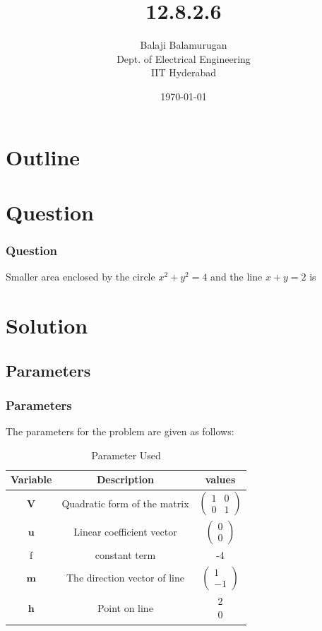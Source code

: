 \documentclass{beamer}
\title{12.8.2.6}
\author{Balaji Balamurugan \\ Dept. of Electrical Engineering \\ IIT Hyderabad}
\date{\today}
\theoremstyle{remark}
\newcommand{\myvec}[1]{\ensuremath{\begin{pmatrix}#1\end{pmatrix}}}
\let\vec\mathbf
\numberwithin{equation}{section}
\begin{document}
\begin{frame}
\titlepage
\end{frame}

\section*{Outline}
\begin{frame}
\tableofcontents
\end{frame}

\section{Question}
\begin{frame}
\frametitle{Question}
Smaller area enclosed by the circle $x^2 + y^2 = 4 $ and the line $x + y = 2 $ is 
\end{frame}

\section{Solution}
\subsection{Parameters}
\begin{frame}
\frametitle{Parameters}
The parameters for the problem are given as follows:
\begin{table}[H]
    \centering
    \begin{tabular}[12pt]{ |c| c| c |}
    \hline
    \textbf{Variable} & \textbf{Description} & \textbf{values}\\ 
    \hline
    $\vec{V}$ & Quadratic form of the matrix & $\myvec{1 & 0 \\ 0 & 1} $\\
    \hline
    $\vec{u}$ & Linear coefficient vector & $\myvec{0 \\ 0} $\\
    \hline
    f & constant term & -4 \\ 
    \hline
    $\vec{m}$ & The direction vector of line & $\myvec{1 \\ -1}$\\
    \hline
     $\vec{h}$ & Point on line & \myvec{2 \\ 0} \\
     \hline
\end{tabular}
    \caption{Parameter Used}
    \label{tab1-1.9-6}
\end{table}

\end{frame}
\end{document}

